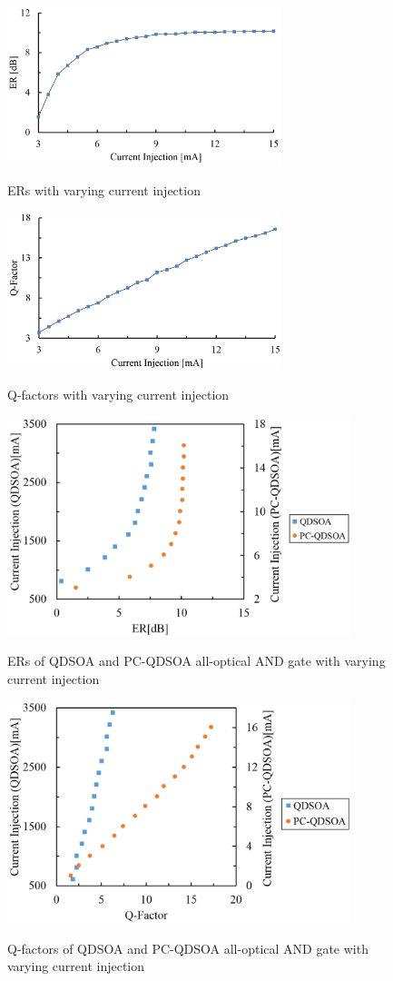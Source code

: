 \documentclass[twocolumn]{el-author}
\begin{document}
\begin{figure}[htbp]
\begin{center}
  \includegraphics[width=80mm,bb=0 0 850 500]{pcqdsoa_ERs.pdf}
  \caption{ERs with varying current injection}
  \label{fig:pcqdsoa_different_pump_current_ERs}
  \includegraphics[width=80mm,bb=0 0 850 500]{pcqdsoa_Qs.pdf}
  \caption{Q-factors with varying current injection}
  \label{fig:pcqdsoa_different_pump_current_Qs}
  \includegraphics[width=100mm,bb=0 0 950 560]{qdsoa_vs_pcqdsoa_ERs.pdf}
  \caption{ERs of QDSOA and PC-QDSOA all-optical AND gate with varying current injection}
  \label{fig:comp_ERs}
  \includegraphics[width=100mm,bb=0 0 950 560]{qdsoa_vs_pcqdsoa_Qs.pdf}
  \caption{Q-factors of QDSOA and PC-QDSOA all-optical AND gate with varying current injection}
  \label{fig:comp_Qs}
\end{center}
\end{figure}
\end{document}
